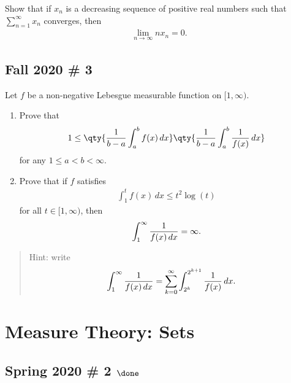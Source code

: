 Show that if \(x_n\) is a decreasing sequence of positive real numbers
such that \(\sum_{n=1}^\infty x_n\) converges, then
\begin{align*}
\lim_{n\to\infty} n x_n = 0.
\end{align*}

\hypertarget{fall-2020-3}{%
\subsection{Fall 2020 \# 3}\label{fall-2020-3}}

Let \(f\) be a non-negative Lebesgue measurable function on
\([1, \infty)\).

\begin{enumerate}
\def\labelenumi{\alph{enumi}.}
\item
  Prove that
  \begin{align*}  
  1 \leq \qty{
  {1 \over b-a} \int_a^b f(x) \,dx
  }\qty{
  {1\over b-a} \int_a^b {1 \over f(x)}\, dx
  }
  \end{align*}
  for any \(1\leq a < b <\infty\).
\item
  Prove that if \(f\) satisfies
  \begin{align*}  
  \int_1^t f(x) \, dx \leq t^2 \log(t)
  \end{align*}
  for all \(t\in [1, \infty)\), then
  \begin{align*}  
  \int_1^\infty {1\over f(x) \,dx} = \infty
  .\end{align*}
\end{enumerate}

\begin{quote}
Hint: write
\begin{align*}  
\int_1^\infty {1\over f(x) \, dx} = \sum_{k=0}^\infty \int_{2^k}^{2^{k+1}} {1 \over f(x)}\,dx
.\end{align*}
\end{quote}

\hypertarget{measure-theory-sets}{%
\section{Measure Theory: Sets}\label{measure-theory-sets}}

\hypertarget{spring-2020-2-done}{%
\subsection{\texorpdfstring{Spring 2020 \# 2
\(\done\)}{Spring 2020 \# 2 \textbackslash done}}\label{spring-2020-2-done}}

